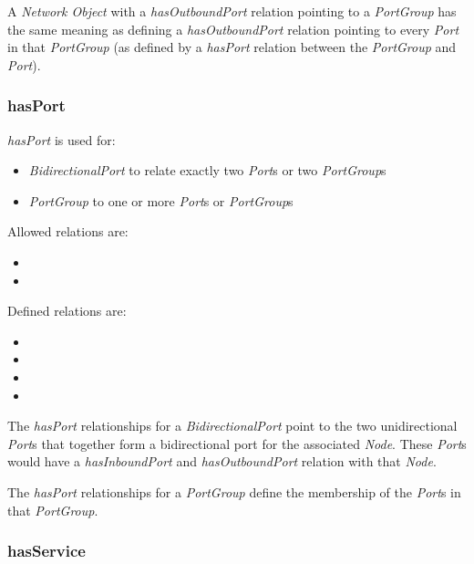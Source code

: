 A \emph{Network Object} with a \emph{hasOutboundPort} relation pointing to a \emph{PortGroup} has the same meaning as defining a \emph{hasOutboundPort} relation pointing to every \emph{Port} in that \emph{PortGroup} (as defined by a \emph{hasPort} relation between the \emph{PortGroup} and \emph{Port}).

\subsubsection{hasPort}%
\label{rel:hasPort}

\emph{hasPort} is used for:
    \begin{itemize}
        \item \emph{BidirectionalPort} to relate exactly two \emph{Port}s or two \emph{PortGroup}s
        \item \emph{PortGroup} to one or more \emph{Port}s or \emph{PortGroup}s
    \end{itemize}

Allowed relations are:
\begin{itemize}
    \item {}
    \item {}
\end{itemize}

Defined relations are:
\begin{itemize}
    \item {}
    \item {}
    \item {}
    \item {}
\end{itemize}

The \emph{hasPort} relationships for a \emph{BidirectionalPort} point to the two unidirectional \emph{Port}s that together form a bidirectional port for the associated \emph{Node}. These \emph{Port}s would have a \emph{hasInboundPort} and \emph{hasOutboundPort} relation with that \emph{Node}.

The \emph{hasPort} relationships for a \emph{PortGroup} define the membership of the \emph{Port}s in that \emph{PortGroup}.

\subsubsection{hasService}%
\label{rel:hasService}

